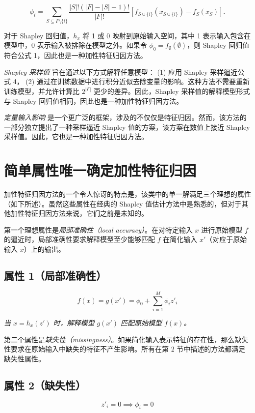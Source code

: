\documentclass[12pt, a4paper]{ctexart} %
\begin{document}
\[
\phi_i = \sum_{S \subseteq F \setminus \{i\}} \frac{|S|!(|F|-|S|-1)!}{|F|!} \left[ f_{S \cup \{i\}}(x_{S \cup \{i\}}) - f_S(x_S) \right].
\]

对于 Shapley 回归值，$h_x$ 将 1 或 0 映射到原始输入空间，其中 1 表示输入包含在模型中，0 表示输入被排除在模型之外。如果令 $\phi_0 = f_{\emptyset}(\emptyset)$，则 Shapley 回归值符合公式 1，因此也是一种加性特征归因方法。


\textit{Shapley 采样值} 旨在通过以下方式解释任意模型：
(1) 应用 Shapley 采样逼近公式 4，  
(2) 通过在训练数据中进行积分近似去除变量的影响。这种方法不需要重新训练模型，并允许计算比 $2^{|F|}$ 更少的差异。因此，Shapley 采样值的解释模型形式与 Shapley 回归值相同，因此也是一种加性特征归因方法。

\textit{定量输入影响} 是一个更广泛的框架，涉及的不仅仅是特征归因。然而，该方法的一部分独立提出了一种采样逼近 Shapley 值的方案，该方案在数值上接近 Shapley 采样值。因此，它也是一种加性特征归因方法。

\section{简单属性唯一确定加性特征归因}

加性特征归因方法的一个令人惊讶的特点是，该类中的单一解满足三个理想的属性（如下所述）。虽然这些属性在经典的 Shapley 值估计方法中是熟悉的，但对于其他加性特征归因方法来说，它们之前是未知的。

第一个理想属性是\textit{局部准确性（local accuracy）}。在对特定输入 $x$ 进行原始模型 $f$ 的逼近时，局部准确性要求解释模型至少能够匹配 $f$ 在简化输入 $x'$（对应于原始输入 $x$）上的输出。

\subsection*{属性 1（局部准确性）}

\[
f(x) = g(x') = \phi_0 + \sum_{i=1}^{M} \phi_i z'_i
\]

\textit{当 $x = h_x(z')$ 时，解释模型 $g(x')$ 匹配原始模型 $f(x)$。}

第二个属性是\textit{缺失性（missingness）}。如果简化输入表示特征的存在性，那么缺失性要求在原始输入中缺失的特征不产生影响。所有在第 2 节中描述的方法都满足缺失性属性。

\subsection*{属性 2（缺失性）}

\[
z'_i = 0 \implies \phi_i = 0
\]
\end{document}
